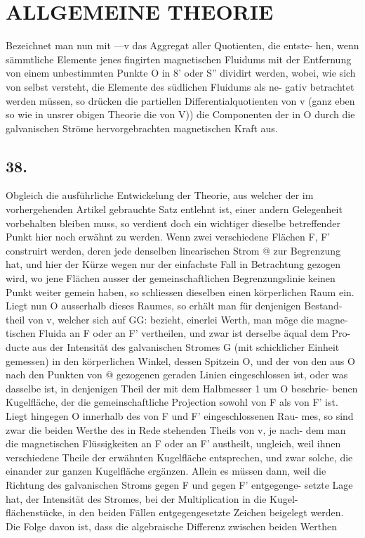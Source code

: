 \documentclass[12pt,a4paper]{article}
\begin{document}
\newpage


\section*{ALLGEMEINE THEORIE}
Bezeichnet man nun mit ---v das Aggregat aller Quotienten, die entste- hen, wenn sämmtliche Elemente jenes fingirten magnetischen Fluidums mit der Entfernung von einem unbestimmten Punkte O in 8' oder S'' dividirt werden, wobei, wie sich von selbst versteht, die Elemente des südlichen Fluidums als ne- gativ betrachtet werden müssen, so drücken die partiellen Differentialquotienten von v (ganz eben so wie in unsrer obigen Theorie die von V)) die Componenten der in O durch die galvanischen Ströme hervorgebrachten magnetischen Kraft aus.

\subsection*{38.}
Obgleich die ausführliche Entwickelung der Theorie, aus welcher der im vorhergehenden Artikel gebrauchte Satz entlehnt ist, einer andern Gelegenheit vorbehalten bleiben muss, so verdient doch ein wichtiger dieselbe betreffender Punkt hier noch erwähnt zu werden. Wenn zwei verschiedene Flächen F, F' construirt werden, deren jede denselben linearischen Strom @ zur Begrenzung hat, und hier der Kürze wegen nur der einfachste Fall in Betrachtung gezogen wird, wo jene Flächen ausser der gemeinschaftlichen Begrenzungslinie keinen Punkt weiter gemein haben, so schliessen dieselben einen körperlichen Raum ein. Liegt nun O ausserhalb dieses Raumes, so erhält man für denjenigen Bestand- theil von v, welcher sich auf GG: bezieht, einerlei Werth, man möge die magne- tischen Fluida an F oder an F' vertheilen, und zwar ist derselbe äqual dem Pro- ducte aus der Intensität des galvanischen Stromes G (mit schicklicher Einheit gemessen) in den körperlichen Winkel, dessen Spitzein O, und der von den aus O nach den Punkten von @ gezogenen geraden Linien eingeschlossen ist, oder was dasselbe ist, in denjenigen Theil der mit dem Halbmesser 1 um O beschrie- benen Kugelfläche, der die gemeinschaftliche Projection sowohl von F als von F' ist. Liegt hingegen O innerhalb des von F und F' eingeschlossenen Rau- mes, so sind zwar die beiden Werthe des in Rede stehenden Theils von v, je nach- dem man die magnetischen Flüssigkeiten an F oder an F' austheilt, ungleich, weil ihnen verschiedene Theile der erwähnten Kugelfläche entsprechen, und zwar solche, die einander zur ganzen Kugelfläche ergänzen. Allein es müssen dann, weil die Richtung des galvanischen Stroms gegen F und gegen F' entgegenge- setzte Lage hat, der Intensität des Stromes, bei der Multiplication in die Kugel- flächenstücke, in den beiden Fällen entgegengesetzte Zeichen beigelegt werden. Die Folge davon ist, dass die algebraische Differenz zwischen beiden Werthen
\end{document}
